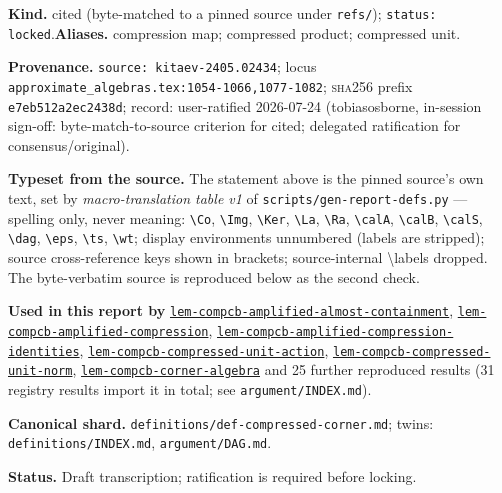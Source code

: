 \begin{defnote}
\textbf{Kind.} cited (byte-matched to a pinned source under \texttt{refs/}); \texttt{status: locked}.\quad\textbf{Aliases.} compression map; compressed product; compressed unit.
\par
\textbf{Provenance.} \texttt{source: kitaev-\allowbreak{}2405.\allowbreak{}02434}; locus \texttt{approximate\_algebras.\allowbreak{}tex:\allowbreak{}1054-\allowbreak{}1066,\allowbreak{}1077-\allowbreak{}1082}; \textsc{sha256} prefix \texttt{e7eb512a2ec2438d}; record: user-\allowbreak{}ratified 2026-\allowbreak{}07-\allowbreak{}24 (tobiasosborne,\allowbreak{} in-\allowbreak{}session sign-\allowbreak{}off:\allowbreak{} byte-\allowbreak{}match-\allowbreak{}to-\allowbreak{}source criterion for cited;\allowbreak{} delegated ratification for consensus/\allowbreak{}original).
\par
\textbf{Typeset from the source.} The statement above is the pinned source's own text, set by \emph{macro-translation table v1} of \texttt{scripts/gen-report-defs.py} --- spelling only, never meaning: \texttt{\textbackslash{}Co}, \texttt{\textbackslash{}Img}, \texttt{\textbackslash{}Ker}, \texttt{\textbackslash{}La}, \texttt{\textbackslash{}Ra}, \texttt{\textbackslash{}calA}, \texttt{\textbackslash{}calB}, \texttt{\textbackslash{}calS}, \texttt{\textbackslash{}dag}, \texttt{\textbackslash{}eps}, \texttt{\textbackslash{}ts}, \texttt{\textbackslash{}wt}; display environments unnumbered (labels are stripped); source cross-reference keys shown in brackets; source-internal \textbackslash{}labels dropped. The byte-verbatim source is reproduced below as the second check.
\par
\textbf{Used in this report by} \hyperref[lem:compcb-amplified-almost-containment]{\texttt{lem-\allowbreak{}compcb-\allowbreak{}amplified-\allowbreak{}almost-\allowbreak{}containment}}, \hyperref[lem:compcb-amplified-compression]{\texttt{lem-\allowbreak{}compcb-\allowbreak{}amplified-\allowbreak{}compression}}, \hyperref[lem:compcb-amplified-compression-identities]{\texttt{lem-\allowbreak{}compcb-\allowbreak{}amplified-\allowbreak{}compression-\allowbreak{}identities}}, \hyperref[lem:compcb-compressed-unit-action]{\texttt{lem-\allowbreak{}compcb-\allowbreak{}compressed-\allowbreak{}unit-\allowbreak{}action}}, \hyperref[lem:compcb-compressed-unit-norm]{\texttt{lem-\allowbreak{}compcb-\allowbreak{}compressed-\allowbreak{}unit-\allowbreak{}norm}}, \hyperref[lem:compcb-corner-algebra]{\texttt{lem-\allowbreak{}compcb-\allowbreak{}corner-\allowbreak{}algebra}} and 25 further reproduced results (31 registry results import it in total; see \texttt{argument/INDEX.md}).
\par
\textbf{Canonical shard.} \texttt{definitions/\allowbreak{}def-\allowbreak{}compressed-\allowbreak{}corner.\allowbreak{}md}; twins: \texttt{definitions/INDEX.md}, \texttt{argument/DAG.md}.
\par
\textbf{Status.} Draft transcription; ratification is required before locking.


\end{defnote}

